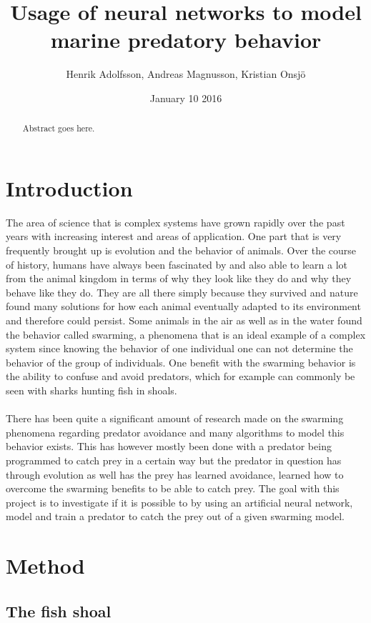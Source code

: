 \documentclass[12pt,A4]{article}
\title{Usage of neural networks to model marine predatory behavior}
\author{Henrik Adolfsson, Andreas Magnusson, Kristian Onsj\"o}
\date{January 10 2016}
\begin{document}
\parindent=0cm

\maketitle

\begin{abstract}
Abstract goes here.
\end{abstract}

\section{Introduction}
The area of science that is complex systems have grown rapidly over the past years with increasing interest and areas of application. One part that is very frequently brought up is evolution and the behavior of animals. Over the course of history, humans have always been fascinated by and also able to learn a lot from the animal kingdom in terms of why they look like they do and why they behave like they do. They are all there simply because they survived and nature found many solutions for how each animal eventually adapted to its environment and therefore could persist. Some animals in the air as well as in the water found the behavior called swarming, a phenomena that is an ideal example of a complex system since knowing the behavior of one individual one can not determine the behavior of the group of individuals. One benefit with the swarming behavior is the ability to confuse and avoid predators, which for example can commonly be seen with sharks hunting fish in shoals.\\
\\
There has been quite a significant amount of research made on the swarming phenomena regarding predator avoidance and many algorithms to model this behavior exists. This has however mostly been done with a predator being programmed to catch prey in a certain way but the predator in question has through evolution as well has the prey has learned avoidance, learned how to overcome the swarming benefits to be able to catch prey. The goal with this project is to investigate if it is possible to by using an artificial neural network, model and train a predator to catch the prey out of a given swarming model.

\newpage

\section{Method}
\subsection{The fish shoal}
\end{document}
